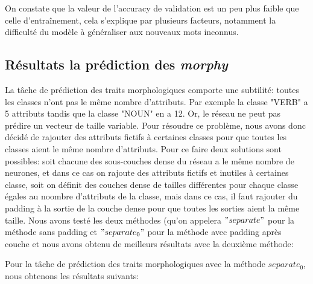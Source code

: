 \documentclass[a4paper]{article}
\begin{document}
On constate que la valeur de l'accuracy de validation est un peu plus faible que celle d'entraînement, cela 
s'explique par plusieurs facteurs, notamment la difficulté du modèle à généraliser aux nouveaux mots inconnus.

\subsection{Résultats la prédiction des \textit{morphy}}

La tâche de prédiction des traits morphologiques comporte une subtilité: toutes les classes n'ont pas le même 
nombre d'attributs. Par exemple la classe "VERB" a 5 attributs tandis que la classe "NOUN" en a 12. Or, le 
réseau ne
peut pas prédire un vecteur de taille variable. Pour résoudre ce problème, nous avons donc décidé de rajouter 
des attributs fictifs à certaines classes pour que toutes les classes aient le même nombre d'attributs. Pour 
ce faire 
deux solutions sont possibles: soit chacune des sous-couches dense du réseau a le même nombre de neurones, et 
dans ce cas on rajoute des attributs fictifs et inutiles à certaines classe,
soit on définit des couches dense de tailles différentes pour chaque classe égales au noombre d'attributs de 
la classe, mais dans ce cas, il faut rajouter
du padding à la sortie de la couche dense pour que toutes les sorties aient la même taille. Nous avons testé 
les deux méthodes (qu'on appelera $"separate"$ pour la méthode sans padding et $"separate_0"$ pour la méthode 
avec padding après couche et nous avons obtenu de meilleurs résultats avec la deuxième méthode:

Pour la tâche de prédiction des traits morphologiques avec la méthode $separate_0$, nous obtenons les résultats 
suivants: %
\end{document}

